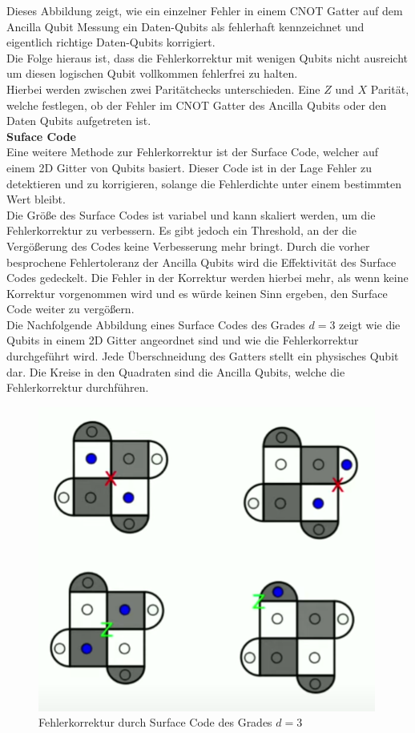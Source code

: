 Dieses Abbildung zeigt, wie ein einzelner Fehler in einem CNOT Gatter auf dem Ancilla Qubit Messung ein Daten-Qubits als fehlerhaft kennzeichnet und eigentlich richtige Daten-Qubits korrigiert.\\
Die Folge hieraus ist, dass die Fehlerkorrektur mit wenigen Qubits nicht ausreicht um diesen logischen Qubit vollkommen fehlerfrei zu halten.\\

Hierbei werden zwischen zwei Paritätchecks unterschieden. Eine $Z$ und $X$ Parität, welche festlegen, ob der Fehler im CNOT Gatter des Ancilla Qubits oder den Daten Qubits aufgetreten ist.\\

\textbf{Suface Code}\\
Eine weitere Methode zur Fehlerkorrektur ist der Surface Code, welcher auf einem 2D Gitter von Qubits basiert.
Dieser Code ist in der Lage Fehler zu detektieren und zu korrigieren, solange die Fehlerdichte unter einem bestimmten Wert bleibt.\\

Die Größe des Surface Codes ist variabel und kann skaliert werden, um die Fehlerkorrektur zu verbessern.
Es gibt jedoch ein Threshold, an der die Vergößerung des Codes keine Verbesserung mehr bringt.
Durch die vorher besprochene Fehlertoleranz der Ancilla Qubits wird die Effektivität des Surface Codes gedeckelt.
Die Fehler in der Korrektur werden hierbei mehr, als wenn keine Korrektur vorgenommen wird und es würde keinen Sinn ergeben, den Surface Code weiter zu vergößern.\\

Die Nachfolgende Abbildung eines Surface Codes des Grades $d=3$ zeigt wie die Qubits in einem 2D Gitter angeordnet sind und wie die Fehlerkorrektur durchgeführt wird.
Jede Überschneidung des Gatters stellt ein physisches Qubit dar. Die Kreise in den Quadraten sind die Ancilla Qubits, welche die Fehlerkorrektur durchführen.\\

\begin{figure}[H]
    \centering
    \includegraphics[width=0.6\linewidth]{img/Errors.png}
    \caption{Fehlerkorrektur durch Surface Code des Grades $d=3$}
    \label{fig:Surface-Code}
\end{figure}

